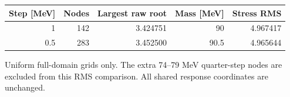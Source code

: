 \begin{center}\small
\begin{tabular}{rrrrr}\toprule
Step [MeV] & Nodes & Largest raw root & Mass [MeV] & Stress RMS\\\midrule
1 & 142 & 3.424751 & 90 & 4.967417\\
0.5 & 283 & 3.452500 & 90.5 & 4.965644\\
\bottomrule\end{tabular}\end{center}
{\small Uniform full-domain grids only. The extra 74--79 MeV quarter-step nodes are excluded from this RMS comparison. All shared response coordinates are unchanged.}

